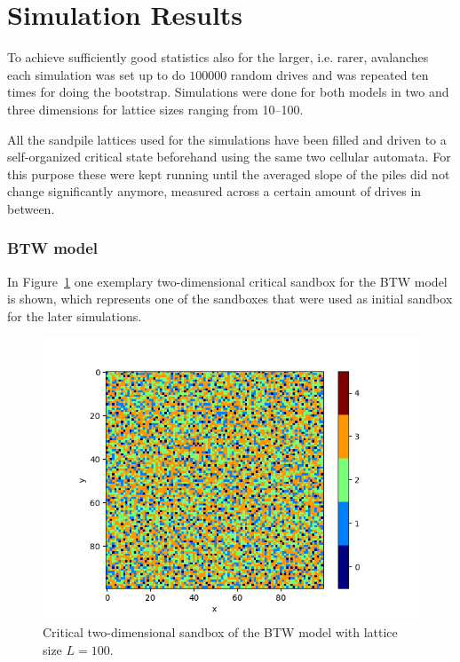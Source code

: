 \section{Simulation Results}
\label{sec:results}
To achieve sufficiently good statistics also for the larger, i.e. rarer, avalanches each simulation was set up to
do $100000$ random drives and was repeated ten times for doing the bootstrap. Simulations were done for both models
in two and three dimensions for lattice sizes ranging from \SIrange{10}{100}{}.

All the sandpile lattices used for the simulations have been filled and driven to a self-organized critical state
beforehand using the same two cellular automata. For this purpose these were kept running until the averaged slope of
the piles did not change significantly anymore, measured across a certain amount of drives in between.

\subsubsection{BTW model}
In Figure~\ref{fig:btwSandbox} one exemplary two-dimensional critical sandbox for the BTW model is shown,
which represents one of the sandboxes that were used as initial sandbox for the later simulations.
\begin{figure}[htb]
    \centering
    \includegraphics[width=\linewidth]{plots/sandboxes/BTW_100x100}
    \caption{Critical two-dimensional sandbox of the BTW model with lattice size $L=100$.}
    \label{fig:btwSandbox}
\end{figure}

